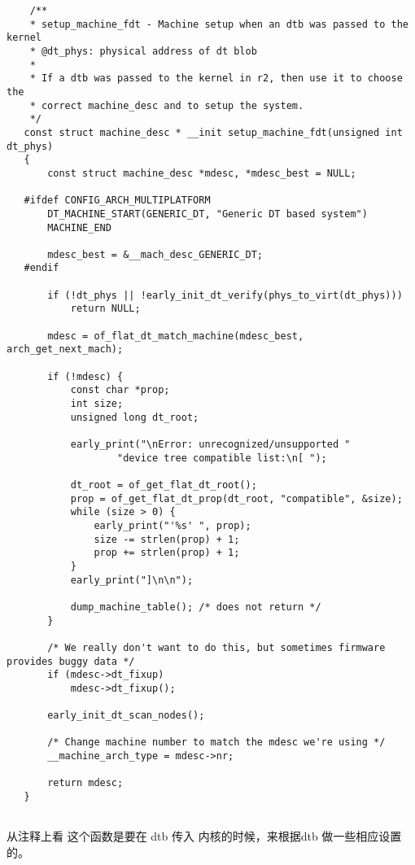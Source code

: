 \begin{lstlisting}
    /**
    * setup_machine_fdt - Machine setup when an dtb was passed to the kernel
    * @dt_phys: physical address of dt blob
    *
    * If a dtb was passed to the kernel in r2, then use it to choose the
    * correct machine_desc and to setup the system.
    */
   const struct machine_desc * __init setup_machine_fdt(unsigned int dt_phys)
   {
       const struct machine_desc *mdesc, *mdesc_best = NULL;
   
   #ifdef CONFIG_ARCH_MULTIPLATFORM
       DT_MACHINE_START(GENERIC_DT, "Generic DT based system")
       MACHINE_END
   
       mdesc_best = &__mach_desc_GENERIC_DT;
   #endif
   
       if (!dt_phys || !early_init_dt_verify(phys_to_virt(dt_phys)))
           return NULL;
   
       mdesc = of_flat_dt_match_machine(mdesc_best, arch_get_next_mach);
   
       if (!mdesc) {
           const char *prop;
           int size;
           unsigned long dt_root;
   
           early_print("\nError: unrecognized/unsupported "
                   "device tree compatible list:\n[ ");
   
           dt_root = of_get_flat_dt_root();
           prop = of_get_flat_dt_prop(dt_root, "compatible", &size);
           while (size > 0) {
               early_print("'%s' ", prop);
               size -= strlen(prop) + 1;
               prop += strlen(prop) + 1;
           }
           early_print("]\n\n");
   
           dump_machine_table(); /* does not return */
       }
   
       /* We really don't want to do this, but sometimes firmware provides buggy data */
       if (mdesc->dt_fixup)
           mdesc->dt_fixup();
   
       early_init_dt_scan_nodes();
   
       /* Change machine number to match the mdesc we're using */
       __machine_arch_type = mdesc->nr;
   
       return mdesc;
   }
   
\end{lstlisting}


从注释上看 这个函数是要在  dtb 传入 内核的时候，来根据dtb 做一些相应设置的。  


